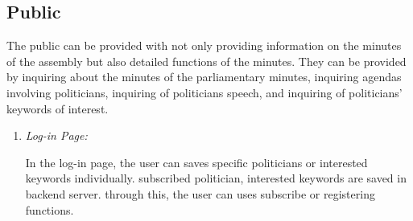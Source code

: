 \documentclass[conference]{IEEEtran}
\begin{document}
\subsection{Public} 
The public can be provided with not only providing information on the minutes of the assembly but also detailed functions of the minutes. They can be provided by inquiring about the minutes of the parliamentary minutes, inquiring agendas involving politicians, inquiring of politicians speech, and inquiring of politicians' keywords of interest.\\
\begin{enumerate}
	\item \textit {Log-in Page: }

	
In the log-in page, the user can saves specific politicians or interested keywords individually. subscribed politician, interested keywords are saved in backend server. through this, the user can uses subscribe or registering functions.\\
	

\end{enumerate}
\end{document}
